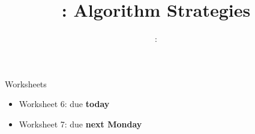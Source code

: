 \usepackage{../../beamerthemeFalmouthGamesAcademy}
\graphicspath{ {../../} }

\lstset{language=[Sharp]C
}

\usepackage[normalem]{ulem}
\usepackage{wasysym}

\usepackage{pdfpages}

\usepackage{algpseudocode}
\usepackage{qtree}

\usetikzlibrary{arrows,automata}
\usetikzlibrary{tikzmark,calc}




\title{\sessionnumber: Algorithm Strategies}
\subtitle{\modulecode: \moduletitle}

\frame{\titlepage} 

\begin{frame}{Worksheets}
	\begin{itemize}
		\item Worksheet 6: due \textbf{today}
		\item Worksheet 7: due \textbf{next Monday}
	\end{itemize}
\end{frame}







